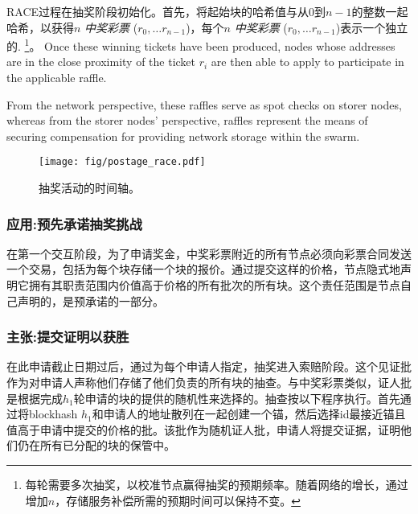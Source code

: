 RACE过程在抽奖阶段初始化。首先，将起始块的哈希值与从$0$到$n-1$的整数一起哈希，以获得$n$ \emph{中奖彩票} ($r_0, \ldots r_{n-1}$)，每个$n$ \emph{中奖彩票} ($r_0, \ldots r_{n-1}$)表示一个独立的.%
%
\footnote{每轮需要多次抽奖，以校准节点赢得抽奖的预期频率。随着网络的增长，通过增加$n$，存储服务补偿所需的预期时间可以保持不变。}。 
%
Once these winning tickets have been produced, nodes whose addresses are in the close proximity of the ticket $r_i$ are then able to apply to participate in the applicable raffle.


From the network perspective, these raffles serve as spot checks on storer nodes, whereas from the storer nodes' perspective, raffles represent the means of securing compensation for providing network storage within the swarm. 


\begin{figure}[htbp]
  \centering
  \texttt{[image: fig/postage\_race.pdf]}
  \caption[事件的时间轴在抽奖轮\statusgreen]{抽奖活动的时间轴。}
  \label{fig:raffle-timeline}
\end{figure}


\subsubsection{应用:预先承诺抽奖挑战}

在第一个交互阶段，为了申请奖金，中奖彩票附近的所有节点必须向彩票合同发送一个交易，包括为每个块存储一个块的报价。通过提交这样的价格，节点隐式地声明它拥有其职责范围内价值高于价格的所有批次的所有块。这个责任范围是节点自己声明的，是预承诺的一部分。 


\subsubsection{主张:提交证明以获胜}

在此申请截止日期过后，通过为每个申请人指定，抽奖进入索赔阶段。这个见证批作为对申请人声称他们存储了他们负责的所有块的抽查。与中奖彩票类似，证人批是根据完成$h_1$轮申请的块的提供的随机性来选择的。抽查按以下程序执行。首先通过将blockhash $h_1$和申请人的地址散列在一起创建一个锚，然后选择id最接近锚且值高于申请中提交的价格的批。该批作为随机证人批，申请人将提交证据，证明他们仍在所有已分配的块的保管中。

